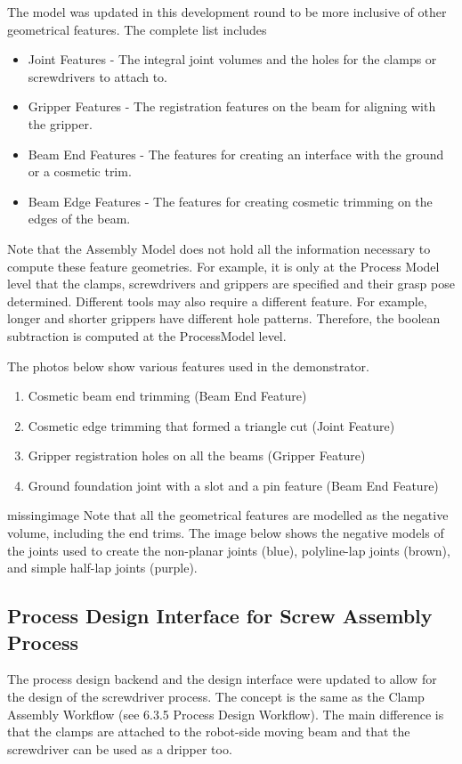 The model was updated in this development round to be more inclusive of other geometrical features. The complete list includes

\begin{itemize}
    \item Joint Features - The integral joint volumes and the holes for the clamps or screwdrivers to attach to.
    \item Gripper Features - The registration features on the beam for aligning with the gripper.
    \item Beam End Features - The features for creating an interface with the ground or a cosmetic trim.
    \item Beam Edge Features - The features for creating cosmetic trimming on the edges of the beam.
\end{itemize}

Note that the Assembly Model does not hold all the information necessary to compute these feature geometries. For example, it is only at the Process Model level that the clamps, screwdrivers and grippers are specified and their grasp pose determined. Different tools may also require a different feature. For example, longer and shorter grippers have different hole patterns. Therefore, the boolean subtraction is computed at the ProcessModel level.

The photos below show various features used in the demonstrator. 
\begin{enumerate}
    \item Cosmetic beam end trimming (Beam End Feature)
    \item Cosmetic edge trimming that formed a triangle cut  (Joint Feature)
    \item Gripper registration holes on all the beams (Gripper Feature)
    \item Ground foundation joint with a slot and a pin feature (Beam End Feature)
\end{enumerate}

missingimage
Note that all the geometrical features are modelled as the negative volume, including the end trims. The image below shows the negative models of the joints used to create the non-planar joints (blue), polyline-lap joints (brown), and simple half-lap joints (purple).

\subsection{Process Design Interface for Screw Assembly Process}
The process design backend and the design interface were updated to allow for the design of the screwdriver process. The concept is the same as the Clamp Assembly Workflow (see 6.3.5 Process Design Workflow). The main difference is that the clamps are attached to the robot-side moving beam and that the screwdriver can be used as a dripper too.

